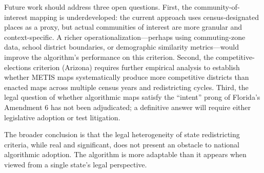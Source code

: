 Future work should address three open questions. First, the community-of-interest mapping is underdeveloped: the current approach uses census-designated places as a proxy, but actual communities of interest are more granular and context-specific. A richer operationalization---perhaps using commuting-zone data, school district boundaries, or demographic similarity metrics---would improve the algorithm's performance on this criterion. Second, the competitive-elections criterion (Arizona) requires further empirical analysis to establish whether METIS maps systematically produce more competitive districts than enacted maps across multiple census years and redistricting cycles. Third, the legal question of whether algorithmic maps satisfy the ``intent'' prong of Florida's Amendment 6 has not been adjudicated; a definitive answer will require either legislative adoption or test litigation.

The broader conclusion is that the legal heterogeneity of state redistricting criteria, while real and significant, does not present an obstacle to national algorithmic adoption. The algorithm is more adaptable than it appears when viewed from a single state's legal perspective.
